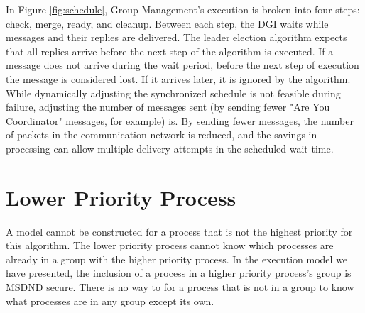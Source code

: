 In Figure \ref{fig:schedule}, Group Management's execution is broken into four steps: check, merge, ready, and cleanup.
Between each step, the DGI waits while messages and their replies are delivered.
The leader election algorithm expects that all replies arrive before the next step of the algorithm is executed.
If a message does not arrive during the wait period, before the next step of execution the message is considered lost.
If it arrives later, it is ignored by the algorithm.
While dynamically adjusting the synchronized schedule is not feasible during failure, adjusting the number of messages sent (by sending fewer "Are You Coordinator" messages, for example) is.
By sending fewer messages, the number of packets in the communication network is reduced, and the savings in processing can allow multiple delivery attempts in the scheduled wait time.

\section{Lower Priority Process}

A model cannot be constructed for a process that is not the highest priority for this algorithm.
The lower priority process cannot know which processes are already in a group with the higher priority process.
In the execution model we have presented, the inclusion of a process in a higher priority process's group is MSDND secure.
There is no way to for a process that is not in a group to know what processes are in any group except its own.



